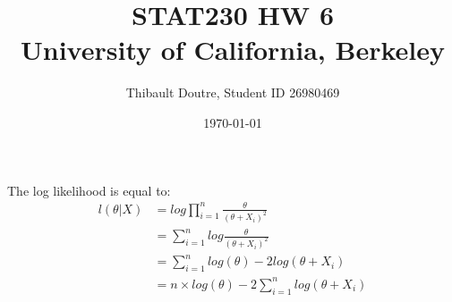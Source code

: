 \documentclass[11pt]{article}\usepackage[]{graphicx}\usepackage[]{color}
\author{Thibault Doutre, Student ID 26980469}
\title{STAT230 HW 6 \\
University of California, Berkeley}
\date{\today}
\begin{document}
\maketitle

\section{}
The log likelihood is equal to:
\begin{align}
l(\theta|X) &= log \prod_{i=1}^n \frac{\theta}{(\theta+X_i)^2} \\
&= \sum_{i=1}^n log \frac{\theta}{(\theta+X_i)^2} \\
&= \sum_{i=1}^n log(\theta)-2log(\theta+X_i)\\
&= n \times log(\theta) - 2\sum_{i=1}^n log(\theta+X_i)
\end{align}
\end{document}
